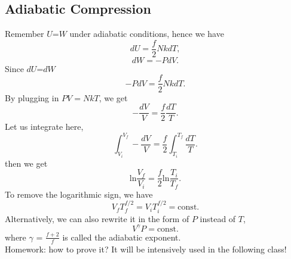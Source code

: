 \subsection{Adiabatic Compression}
Remember $U$=$W$ under adiabatic conditions, hence we have 
\begin{equation} \label{du} dU = \frac{f}{2}NkdT, \end{equation}
\begin{equation} \label{dW} dW = -PdV. \end{equation}
Since $dU$=$dW$
\begin{equation} \label{duw1} -PdV = \frac{f}{2}NkdT. \end{equation}
By plugging in $PV = NkT$, we get
\begin{equation} \label{duw2} -\frac{dV}{V} = \frac{f}{2} \frac{dT}{T}. \end{equation}
Let us integrate here,
\begin{equation} \label{duw3} \int_{V_{i}}^{V_{f}}  -\frac{dV}{V} = \frac{f}{2} \int_{T_{i}}^{T_{f}} \frac{dT}{T}. \end{equation}
then we get
\begin{equation} \label{duw4} \textrm{ln}\frac{V_f}{V_i} = \frac{f}{2} \textrm{ln}\frac{T_i}{T_f}. \end{equation}
To remove the logarithmic sign, we have 
\begin{equation} \label{duw5} V_fT_f^{f/2} = V_iT_i^{f/2} = \textrm{const}. \end{equation}
Alternatively, we can also rewrite it in the form of $P$ instead of $T$,
\begin{equation} \label{duw6} V^{\gamma}P = \textrm{const}. \end{equation}
where ${\gamma}$ = $\frac{f+2}{f}$ is called the adiabatic exponent.\\
Homework: how to prove it? It will be intensively used in the following class!

{}

